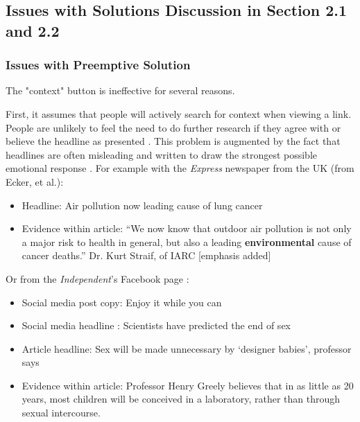 \documentclass[12pt]{article}
\begin{document}
 
 
 \subsection{Issues with Solutions Discussion in Section 2.1 and 2.2}
 \subsubsection{Issues with Preemptive Solution}
 The "context" button is ineffective for several reasons. 
 
 First, it assumes that people will actively search for context when viewing a link. People are unlikely to feel the need to do further research if they agree with or believe the headline as presented \cite{nyhan2010corrections}. This problem is augmented by the fact that headlines are often misleading and written to draw the strongest possible emotional response \cite{chesney2017incongruent,ecker2014effects,bell1984good,molek2013towards,kilgo2018new,vettehen2008explaining}. For example with the \textit{Express} newspaper from the UK (from Ecker, et al.):
 \begin{itemize}
 \item Headline: Air pollution now leading cause of lung cancer
\item Evidence within article: “We now know that outdoor air pollution is not only a major risk to health in general, but also a leading \textbf{environmental} cause of cancer deaths.” Dr. Kurt Straif, of IARC [emphasis added]
 \end{itemize}
 
 Or from the \textit{Independent}'s Facebook page \cite{chesney2017incongruent}:
 \begin{itemize}
\item Social media post copy: Enjoy it while you
can
\item Social media headline \footnotemark[1]: Scientists have predicted the end of sex
\item Article headline\footnotemark[2]: Sex will be made unnecessary by ‘designer babies’, professor says
\item Evidence within article: Professor Henry Greely believes that in as little as 20 years, most children will be conceived in a laboratory, rather than through sexual intercourse.
 \end{itemize}
 
\end{document}
